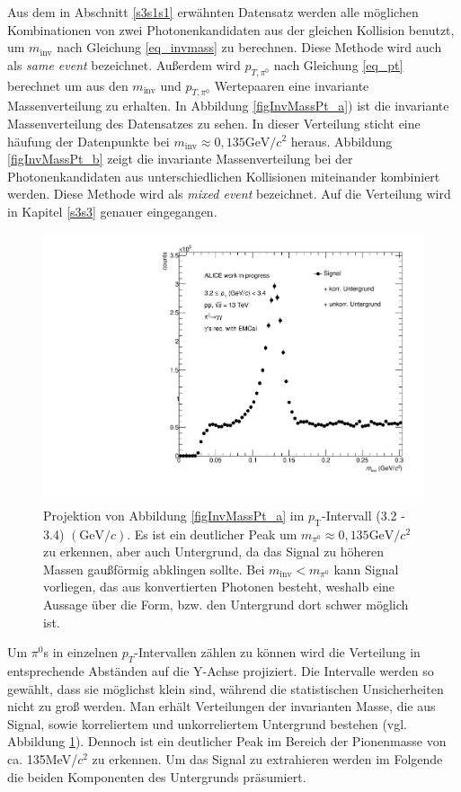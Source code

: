 Aus dem in Abschnitt \ref{s3s1s1} erw{\"a}hnten Datensatz werden alle m{\"o}glichen Kombinationen von zwei Photonenkandidaten aus der gleichen Kollision benutzt, um $m_{\text{inv}}$ nach Gleichung \ref{eq_invmass} zu berechnen. Diese Methode wird auch als {\it same event} bezeichnet. Au{\ss}erdem wird $p_{T,\pi^{0}}$ nach Gleichung \ref{eq_pt} berechnet um aus den $m_{\text{inv}}$ und $p_{T,\pi^{0}}$ Wertepaaren eine invariante Massenverteilung zu erhalten. In Abbildung \ref{figInvMassPt_a}) ist die invariante Massenverteilung des Datensatzes zu sehen. In dieser Verteilung sticht eine h{\"a}ufung der Datenpunkte bei $m_{\text{inv}}\approx 0,135\text{GeV/}c^{2}$ heraus. Abbildung \ref{figInvMassPt_b} zeigt die invariante Massenverteilung bei der Photonenkandidaten aus unterschiedlichen Kollisionen miteinander kombiniert werden. Diese Methode wird als {\it mixed event} bezeichnet. Auf die Verteilung wird in Kapitel \ref{s3s3} genauer eingegangen.

	\begin{figure}[tbp]
		\centering
		\includegraphics[width=.7\linewidth]{hSignalPlusBkg.pdf}
		\caption{Projektion von Abbildung \ref{figInvMassPt_a} im $p_{\text{T}}$-Intervall (3.2 - 3.4) $(\text{GeV/}c)$. Es ist ein deutlicher Peak um $m_{\pi^{0}} \approx 0,135\text{GeV/}c^{2}$ zu erkennen, aber auch Untergrund, da das Signal zu h{\"o}heren Massen gau{\ss}f{\"o}rmig abklingen sollte. Bei $m_{\text{inv}} < m_{\pi^{0}}$ kann Signal vorliegen, das aus konvertierten Photonen besteht, weshalb eine Aussage {\"u}ber die Form, bzw. den Untergrund dort schwer m{\"o}glich ist.}
		\label{figSignalPlusBkg}
	\end{figure}

	Um $\pi^{0}$s in einzelnen $p_{T}$-Intervallen z{\"a}hlen zu k{\"o}nnen wird die Verteilung in entsprechende Abst{\"a}nden auf die Y-Achse projiziert. Die Intervalle werden so gew{\"a}hlt, dass sie m{\"o}glichst klein sind, w{\"a}hrend die statistischen Unsicherheiten nicht zu gro{\ss} werden. Man erh{\"a}lt Verteilungen der invarianten Masse, die aus Signal, sowie korreliertem und unkorreliertem Untergrund bestehen (vgl. Abbildung \ref{figSignalPlusBkg}). Dennoch ist ein deutlicher Peak im Bereich der Pionenmasse von ca. 135MeV/$c^{2}$ zu erkennen. Um das Signal zu extrahieren werden im Folgende die beiden Komponenten des Untergrunds pr{\"a}sumiert.